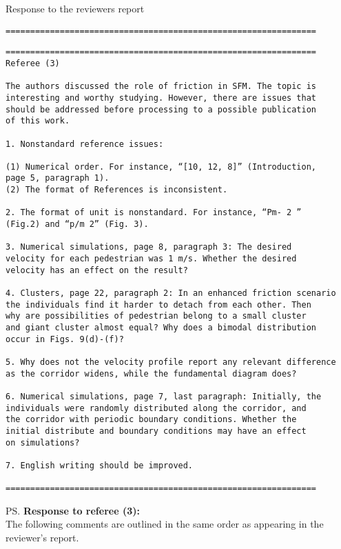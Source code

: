 \documentclass[a4paper,12pt]{letter}
\begin{document}
\begin{letter}{Response to the reviewers report}
{\begin{verbatim}
===============================================================
\end{verbatim}

}

\newpage

\begin{verbatim}
===============================================================
Referee (3)

The authors discussed the role of friction in SFM. The topic is 
interesting and worthy studying. However, there are issues that 
should be addressed before processing to a possible publication 
of this work.

1. Nonstandard reference issues:

(1) Numerical order. For instance, “[10, 12, 8]” (Introduction,
page 5, paragraph 1).
(2) The format of References is inconsistent.

2. The format of unit is nonstandard. For instance, “Pm- 2 ” 
(Fig.2) and “p/m 2” (Fig. 3).

3. Numerical simulations, page 8, paragraph 3: The desired 
velocity for each pedestrian was 1 m/s. Whether the desired 
velocity has an effect on the result?

4. Clusters, page 22, paragraph 2: In an enhanced friction scenario 
the individuals find it harder to detach from each other. Then 
why are possibilities of pedestrian belong to a small cluster 
and giant cluster almost equal? Why does a bimodal distribution 
occur in Figs. 9(d)-(f)?

5. Why does not the velocity profile report any relevant difference 
as the corridor widens, while the fundamental diagram does?

6. Numerical simulations, page 7, last paragraph: Initially, the 
individuals were randomly distributed along the corridor, and 
the corridor with periodic boundary conditions. Whether the 
initial distribute and boundary conditions may have an effect 
on simulations?

7. English writing should be improved.

===============================================================

\end{verbatim}


\ps{\textbf{Response to referee (3):} \\

The following comments are outlined in the same order as appearing in the
reviewer’s report. \\

}
\end{letter}
\end{document}
